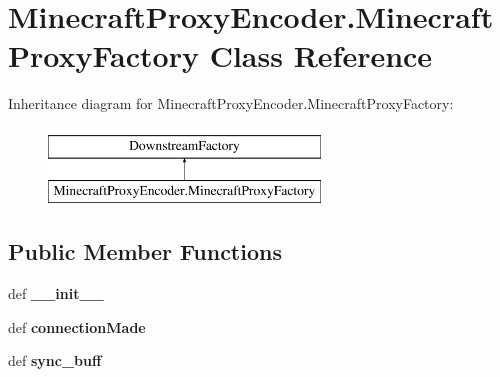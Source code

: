 \hypertarget{classMinecraftProxyEncoder_1_1MinecraftProxyFactory}{\section{Minecraft\-Proxy\-Encoder.\-Minecraft\-Proxy\-Factory Class Reference}
\label{classMinecraftProxyEncoder_1_1MinecraftProxyFactory}
}
Inheritance diagram for Minecraft\-Proxy\-Encoder.\-Minecraft\-Proxy\-Factory\-:\begin{figure}[H]
\begin{center}
\leavevmode
\includegraphics[height=2.000000cm]{classMinecraftProxyEncoder_1_1MinecraftProxyFactory}
\end{center}
\end{figure}
\subsection*{Public Member Functions}
\begin{DoxyCompactItemize}
\item 
\hypertarget{classMinecraftProxyEncoder_1_1MinecraftProxyFactory_ada29cb19ac42324305975b278c95e27e}{def {\bfseries \-\_\-\-\_\-init\-\_\-\-\_\-}}\label{classMinecraftProxyEncoder_1_1MinecraftProxyFactory_ada29cb19ac42324305975b278c95e27e}

\item 
\hypertarget{classMinecraftProxyEncoder_1_1MinecraftProxyFactory_ab3cd1d406e7d7bd7663df559aade3b94}{def {\bfseries connection\-Made}}\label{classMinecraftProxyEncoder_1_1MinecraftProxyFactory_ab3cd1d406e7d7bd7663df559aade3b94}

\item 
\hypertarget{classMinecraftProxyEncoder_1_1MinecraftProxyFactory_a2d37171bf0d968dd0ddedff9fb50e847}{def {\bfseries sync\-\_\-buff}}\label{classMinecraftProxyEncoder_1_1MinecraftProxyFactory_a2d37171bf0d968dd0ddedff9fb50e847}

\end{DoxyCompactItemize}
